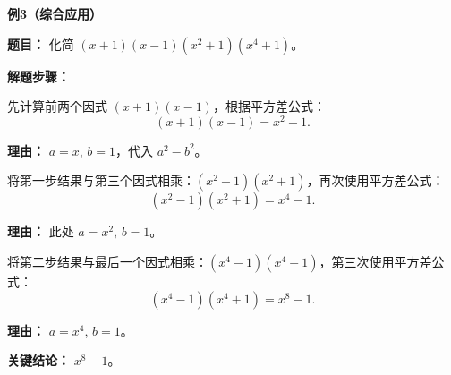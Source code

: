 \begin{examplebox}
	\medskip
	\textbf{\textcolor{CExample}{例3（综合应用）}}

	\textbf{\textcolor{CExample}{题目：}}
	化简 $(x+1)(x-1)(x^2+1)(x^4+1)$。

	\textbf{\textcolor{CExample}{解题步骤：}}
	\begin{description}[style=nextline, leftmargin=2.8em, labelsep=0.5em, itemsep=0.45em]
		\item[\textbf{第一步（首次平方差）：}] 先计算前两个因式 $(x+1)(x-1)$，根据平方差公式：
			\[
				(x+1)(x-1) = x^2 - 1.
			\]
			\par\textbf{理由：} $a=x$, $b=1$，代入 $a^2-b^2$。
		\item[\textbf{第二步（二次平方差）：}] 将第一步结果与第三个因式相乘：$(x^2-1)(x^2+1)$，再次使用平方差公式：
			\[
				(x^2-1)(x^2+1) = x^4 - 1.
			\]
			\par\textbf{理由：} 此处 $a=x^2$, $b=1$。
		\item[\textbf{第三步（三次平方差）：}] 将第二步结果与最后一个因式相乘：$(x^4-1)(x^4+1)$，第三次使用平方差公式：
			\[
				(x^4-1)(x^4+1) = x^8 - 1.
			\]
			\par\textbf{理由：} $a=x^4$, $b=1$。
	\end{description}
	\textbf{\textcolor{CExample}{关键结论：}}
	\textbf{$x^8-1$}。
\end{examplebox}
